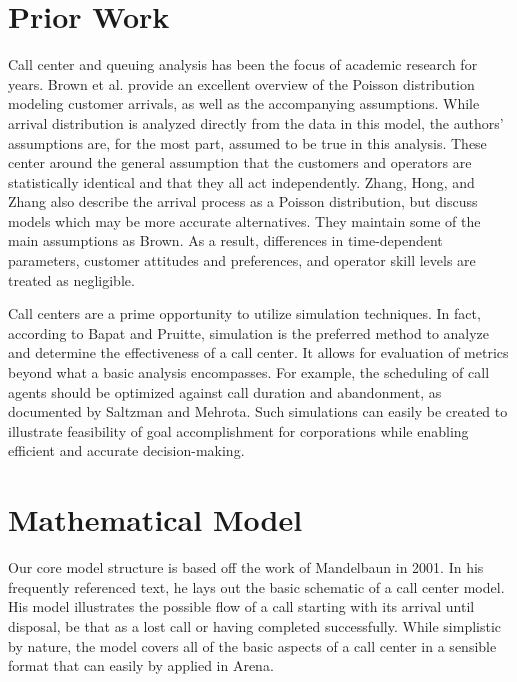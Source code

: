 \documentclass[12pt,twocolumn]{article}
\begin{document}
\section{Prior Work}

Call center and queuing analysis has been the focus of academic research for years.  Brown et al. provide an excellent overview of the Poisson distribution modeling customer arrivals, as well as the accompanying assumptions.  While arrival distribution is analyzed directly from the data in this model, the authors' assumptions are, for the most part, assumed to be true in this analysis.  These center around the general assumption that the customers and operators are statistically identical and that they all act independently.\cite{brown}  Zhang, Hong, and Zhang also describe the arrival process as a Poisson distribution, but discuss models which may be more accurate alternatives.\cite{zhang}  They maintain some of the main assumptions as Brown.  As a result, differences in time-dependent parameters, customer attitudes and preferences, and operator skill levels are treated as negligible.
\par
Call centers are a prime opportunity to utilize simulation techniques.  In fact, according to Bapat and Pruitte, simulation is the preferred method to analyze and determine the effectiveness of a call center.\cite{bapat}  It allows for evaluation of metrics beyond what a basic analysis encompasses.  For example, the scheduling of call agents should be optimized against call duration and abandonment, as documented by Saltzman and Mehrota.\cite{saltzman}  Such simulations can easily be created to illustrate feasibility of goal accomplishment for corporations while enabling efficient and accurate decision-making.\cite{saltzmeh}

\section{Mathematical Model}

Our core model structure is based off the work of Mandelbaun in 2001.  In his frequently referenced text, he lays out the basic schematic of a call center model.  His model illustrates the possible flow of a call starting with its arrival until disposal, be that as a lost call or having completed successfully.\cite{mandelbaun}  While simplistic by nature, the model covers all of the basic aspects of a call center in a sensible format that can easily by applied in Arena.  
\end{document}
